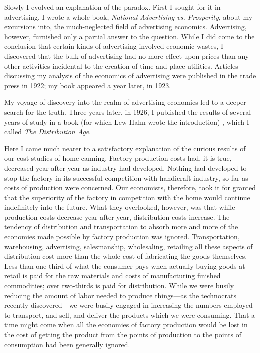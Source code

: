 \documentclass{book}
\begin{document}
Slowly I evolved an explanation of the paradox. First I sought for it in advertising. I wrote a whole book, \emph{National Advertising vs. Prosperity}, about my excursions into, the much-neglected field of advertising economics. Advertising, however, furnished only a partial answer to the question. While I did come to the conclusion that certain kinds of advertising involved economic wastes, I discovered that the bulk of advertising had no more effect upon prices than any other activities incidental to the creation of time and place utilities. Articles discussing my analysis of the economics of advertising were published in the trade press in 1922; my book appeared a year later, in 1923.

My voyage of discovery into the realm of advertising economics led to a deeper search for the truth. Three years later, in 1926, I published the results of several years of study in a book (for which Lew Hahn wrote the introduction) , which I called \emph{The Distribution Age}.

Here I came much nearer to a satisfactory explanation of the curious results of our cost studies of home canning. Factory production costs had, it is true, decreased year after year as industry had developed. Nothing had developed to stop the factory in its successful competition with handicraft industry, so far as costs of production were concerned. Our economists, therefore, took it for granted that the superiority of the factory in competition with the home would continue indefinitely into the future. What they overlooked, however, was that while production costs decrease year after year, distribution costs increase. The tendency of distribution and transportation to absorb more and more of the economies made possible by factory production was ignored. Transportation, warehousing, advertising, salesmanship, wholesaling, retailing all these aspects of distribution cost more than the whole cost of fabricating the goods themselves. Less than one-third of what the consumer pays when actually buying goods at retail is paid for the raw materials and costs of manufacturing finished commodities; over two-thirds is paid for distribution. While we were busily reducing the amount of labor needed to produce things—as the technocrats recently discovered—we were busily engaged in increasing the numbers employed to transport, and sell, and deliver the products which we were consuming. That a time might come when all the economies of factory production would be lost in the cost of getting the product from the points of production to the points of consumption had been generally ignored.
\end{document}
